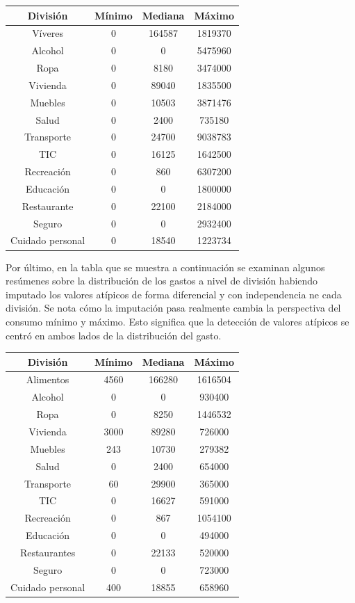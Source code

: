 \documentclass[
  10pt,
  spanish,
]{book}
\begin{document}
\begin{longtable}[]{@{}cccc@{}}
\toprule
División & Mínimo & Mediana & Máximo \\
\midrule
\endhead
Víveres & 0 & 164587 & 1819370 \\
Alcohol & 0 & 0 & 5475960 \\
Ropa & 0 & 8180 & 3474000 \\
Vivienda & 0 & 89040 & 1835500 \\
Muebles & 0 & 10503 & 3871476 \\
Salud & 0 & 2400 & 735180 \\
Transporte & 0 & 24700 & 9038783 \\
TIC & 0 & 16125 & 1642500 \\
Recreación & 0 & 860 & 6307200 \\
Educación & 0 & 0 & 1800000 \\
Restaurante & 0 & 22100 & 2184000 \\
Seguro & 0 & 0 & 2932400 \\
Cuidado personal & 0 & 18540 & 1223734 \\
\bottomrule
\end{longtable}

Por último, en la tabla que se muestra a continuación se examinan algunos resúmenes sobre la distribución de los gastos a nivel de división habiendo imputado los valores atípicos de forma diferencial y con independencia ne cada división. Se nota cómo la imputación pasa realmente cambia la perspectiva del consumo mínimo y máximo. Esto significa que la detección de valores atípicos se centró en ambos lados de la distribución del gasto.

\begin{longtable}[]{@{}cccc@{}}
\toprule
División & Mínimo & Mediana & Máximo \\
\midrule
\endhead
Alimentos & 4560 & 166280 & 1616504 \\
Alcohol & 0 & 0 & 930400 \\
Ropa & 0 & 8250 & 1446532 \\
Vivienda & 3000 & 89280 & 726000 \\
Muebles & 243 & 10730 & 279382 \\
Salud & 0 & 2400 & 654000 \\
Transporte & 60 & 29900 & 365000 \\
TIC & 0 & 16627 & 591000 \\
Recreación & 0 & 867 & 1054100 \\
Educación & 0 & 0 & 494000 \\
Restaurantes & 0 & 22133 & 520000 \\
Seguro & 0 & 0 & 723000 \\
Cuidado personal & 400 & 18855 & 658960 \\
\bottomrule
\end{longtable}
\end{document}
